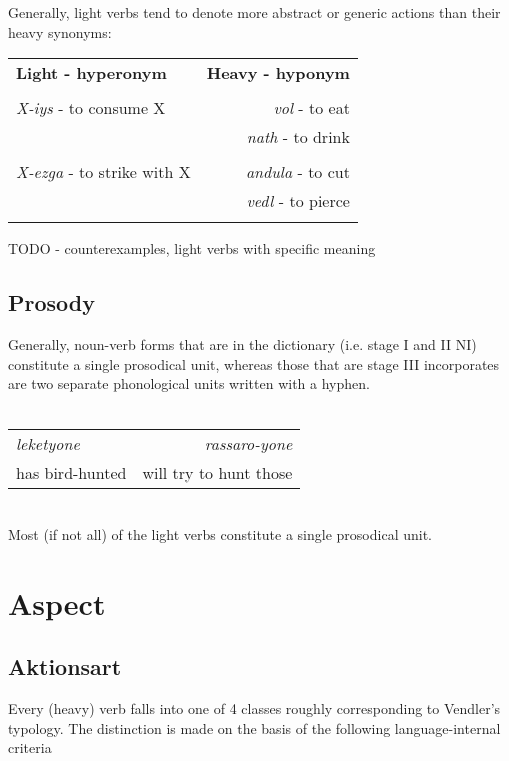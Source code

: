 \documentclass[8pt]{book}
\begin{document}
Generally, light verbs tend to denote more abstract or generic actions than their heavy synonyms:

\begin{tabular}{l r}

\textbf{Light - hyperonym} & \textbf{Heavy - hyponym} \\\\

\textit{X-iys} - to consume X & \textit{vol} - to eat \\
                              & \textit{nath} - to drink \\\\
                              

\textit{X-ezga} - to strike with X & \textit{andula} - to cut \\
                                   & \textit{vedl} - to pierce \\\\
\end{tabular}


TODO - counterexamples, light verbs with specific meaning


\subsection{Prosody}
Generally, noun-verb forms that are in the dictionary (i.e. stage I and II NI) constitute a single prosodical unit, whereas those that are stage III incorporates are two separate phonological units written with a hyphen. \\\\
\begin{tabular}{l r}
\textit{leketyone} & \textit{rassaro-yone} \\
 has bird-hunted &  will try to hunt those \\
\end{tabular}
\\

Most (if not all) of the light verbs constitute a single prosodical unit.

\section{Aspect}
\subsection{Aktionsart}

Every (heavy) verb falls into one of 4 classes roughly corresponding to Vendler's typology. The distinction is made on the basis of the following language-internal criteria
\end{document}

